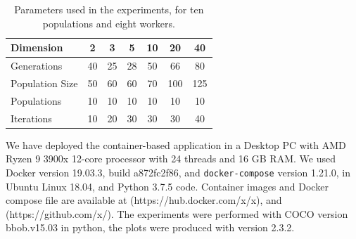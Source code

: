 \documentclass[runningheads]{llncs}
\begin{document}
\begin{table}[h!tb]
  \small
  \caption{Parameters used in the experiments, for ten populations and eight workers.
  }
  \label{tab:params:10}
  \vspace{0.25cm}
  \centering
  \small
  \begin{tabular}{|l|c|c|c|c|c|c|}
    \hline
    Dimension        & 2  & 3  & 5  & 10 & 20  & 40  \\ \hline
    Generations      & 40 & 25 & 28 & 50 & 66  & 80  \\ \hline
    Population Size  & 50 & 60 & 60 & 70 & 100 & 125 \\ \hline
    Populations      & 10 & 10 & 10 & 10 & 10  & 10  \\ \hline
    Iterations       & 10 & 20 & 30 & 30 & 30  & 40  \\ \hline  
  \end{tabular}
\end{table}

We have deployed the container-based application in a
Desktop PC with AMD Ryzen 9 3900x 12-core processor with 24 threads 
and 16 GB RAM. We used Docker version 19.03.3, build a872fc2f86, and {\tt docker-compose} version 1.21.0, 
in Ubuntu Linux 18.04, and Python 3.7.5 code. Container images and Docker compose file are available at
(https://hub.docker.com/x/x), and (https://github.com/x/).
The experiments were performed with COCO \cite{hansen2016coco} version bbob.v15.03 in python, 
the plots were produced with version 2.3.2.
\end{document}

